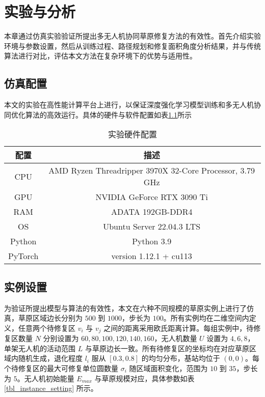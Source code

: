 \documentclass[AutoFakeBold]{LZUThesis}
\begin{document}
\chapter{实验与分析}
本章通过仿真实验验证所提出多无人机协同草原修复方法的有效性。首先介绍实验环境与参数设置，然后从训练过程、路径规划和修复面积角度分析结果，并与传统算法进行对比，评估本文方法在复杂环境下的优势与适用性。
\label{sub:实验配置表格}

\section{仿真配置}
本文的实验在高性能计算平台上进行，以保证深度强化学习模型训练和多无人机协同优化算法的高效运行。具体的硬件与软件配置如表\ref{tbl_hardware_config}所示
\begin{table}[htbp]
	\centering
	\caption{实验硬件配置}
	\begin{tabular}{cc}
		\toprule
		配置      & 描述                                                       \\
		\midrule
		CPU     & AMD Ryzen Threadripper 3970X 32-Core Processor, 3.79 GHz \\
		GPU     & NVIDIA GeForce RTX 3090 Ti                               \\
		RAM     & ADATA 192GB-DDR4                                         \\
		OS      & Ubuntu Server 22.04.3 LTS                                \\
		Python  & Python 3.9                                               \\
		PyTorch & version 1.12.1 + cu113                                   \\
		\bottomrule
	\end{tabular}
	\label{tbl_hardware_config}
\end{table}

\section{实例设置}
为验证所提出模型与算法的有效性，本文在六种不同规模的草原实例上进行了仿真，草原区域边长分别为 $500$ 到 $1000$，步长为 $100$。所有实例均在二维空间内定义，任意两个待修复区 $v_i$ 与 $v_j$ 之间的距离采用欧氏距离计算。每组实例中，待修复区数量 $N$ 分别设置为 $60, 80, 100, 120, 140, 160$，无人机数量 $U$ 设置为 $4, 6, 8$，单架无人机的活动范围 $L$ 与草原边长一致。所有待修复区的坐标均在对应草原区域内随机生成，退化程度 $l_i$ 服从 $[0.3, 0.8]$ 的均匀分布，基站均位于 $(0,0)$。每个待修复区的最大可修复单位圆数量 $\sigma_i$ 随区域面积变化，范围为 $10$ 到 $35$，步长为 $5$。无人机初始能量 $E_{max}$ 与草原规模对应，具体参数如表\ref{tbl_instance_setting} 所示。
\end{document}

